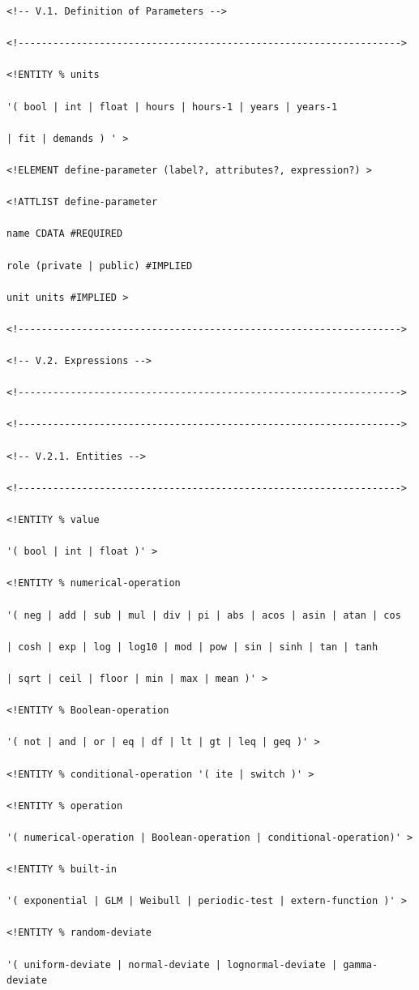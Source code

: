 \documentclass[11pt]{article}
\begin{document}
\begin{lstlisting}
<!-- V.1. Definition of Parameters -->

<!------------------------------------------------------------------>

<!ENTITY % units

'( bool | int | float | hours | hours-1 | years | years-1

| fit | demands ) ' >

<!ELEMENT define-parameter (label?, attributes?, expression?) >

<!ATTLIST define-parameter

name CDATA #REQUIRED

role (private | public) #IMPLIED

unit units #IMPLIED >

<!------------------------------------------------------------------>

<!-- V.2. Expressions -->

<!------------------------------------------------------------------>

<!------------------------------------------------------------------>

<!-- V.2.1. Entities -->

<!------------------------------------------------------------------>

<!ENTITY % value

'( bool | int | float )' >

<!ENTITY % numerical-operation

'( neg | add | sub | mul | div | pi | abs | acos | asin | atan | cos

| cosh | exp | log | log10 | mod | pow | sin | sinh | tan | tanh

| sqrt | ceil | floor | min | max | mean )' >

<!ENTITY % Boolean-operation

'( not | and | or | eq | df | lt | gt | leq | geq )' >

<!ENTITY % conditional-operation '( ite | switch )' >

<!ENTITY % operation

'( numerical-operation | Boolean-operation | conditional-operation)' >

<!ENTITY % built-in

'( exponential | GLM | Weibull | periodic-test | extern-function )' >

<!ENTITY % random-deviate

'( uniform-deviate | normal-deviate | lognormal-deviate | gamma-deviate


\end{lstlisting}
\end{document}
